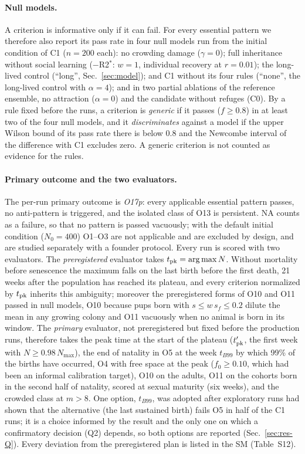 \paragraph{Null models.}
A criterion is informative only if it can fail. For every essential pattern we therefore also report its pass
rate in four null models run from the initial condition of \textsf{C1} ($n=200$ each): no crowding damage
($\gamma=0$); full inheritance without social learning ($-$R2$^*$: $w=1$, individual recovery at $r=0.01$); the
long-lived control (``long'', Sec.~\ref{sec:model}); and \textsf{C1} without its four rules (``none'', the long-lived
control with $\alpha=4$); and in two
partial ablations of the reference ensemble, no attraction ($\alpha=0$) and the candidate without refuges
(\textsf{C0}). By a rule fixed before the runs, a criterion is \emph{generic} if it passes ($f\ge0.8$) in at least
two of the four null models, and it \emph{discriminates} against a model if the upper Wilson bound of its pass rate
there is below 0.8 and the Newcombe interval of the difference with \textsf{C1} excludes zero. A generic criterion
is not counted as evidence for the rules.

\paragraph{Primary outcome and the two evaluators.}
The per-run primary outcome is \emph{O17p}: every applicable essential pattern passes, no anti-pattern is
triggered, and the isolated class of O13 is persistent. NA counts as a failure, so that no pattern is passed
vacuously; with the default initial condition ($N_0=400$) O1--O3 are not applicable and are excluded by design, and
are studied separately with a founder protocol. Every run is scored with two evaluators. The \emph{preregistered}
evaluator takes $t_{\rm pk}=\arg\max N$. Without mortality before senescence the maximum falls on the
last birth before the first death, 21 weeks after the population has reached its plateau, and every criterion
normalized by $t_{\rm pk}$ inherits this ambiguity; moreover the preregistered forms of O10 and O11 passed in null
models, O10 because pups born with $s\le w\,s_f\le0.2$ dilute the mean in any growing colony and O11 vacuously when
no animal is born in its window. The \emph{primary} evaluator, not preregistered but fixed before the production runs, therefore takes the peak time at the start of the plateau
($t'_{\rm pk}$, the first week with $N\ge0.98\,N_{\max}$), the end of natality in O5 at the week $t_{B99}$ by which
99\% of the births have occurred, O4 with free space at the peak ($f_0\ge0.10$, which had been an informal
calibration target), O10 on the adults, O11 on the cohorts born in the second half of natality, scored at sexual
maturity (six weeks), and the crowded class at $m>8$. One option, $t_{B99}$, was adopted after exploratory runs had
shown that the alternative (the last sustained birth) fails O5 in half of the \textsf{C1} runs; it is a choice
informed by the result and the only one on which a confirmatory decision (Q2) depends, so both options are
reported (Sec.~\ref{sec:res-Q}). Every deviation from the preregistered plan is listed in the SM (Table~S12).

